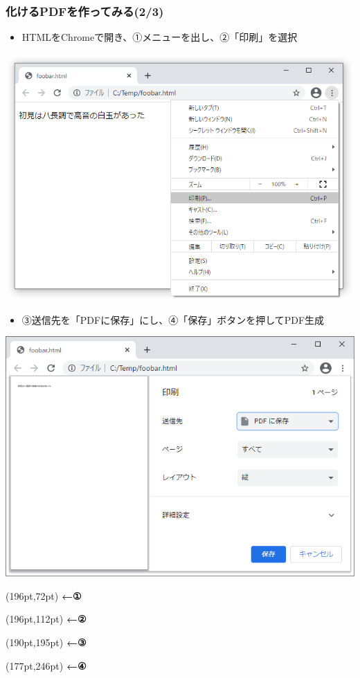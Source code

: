 \begin{frame}\frametitle{化けるPDFを作ってみる(2/3)}
  \begin{itemize}
    \tiny
  \item HTMLをChromeで開き、①メニューを出し、②「印刷」を選択
  \end{itemize}
  \centering
  \includegraphics[width=0.4\linewidth]{chrome-menu-print.png}
  \begin{itemize}
    \tiny
  \item ③送信先を「PDFに保存」にし、④「保存」ボタンを押してPDF生成
  \end{itemize}
  \centering
  \includegraphics[width=0.4\linewidth]{chrome-print-to-pdf.png}

  \begin{textblock*}{0.3\linewidth}(196pt,72pt)
    \tiny \textbf{\color{red} ←①}
  \end{textblock*}
  \begin{textblock*}{0.3\linewidth}(196pt,112pt)
    \tiny \textbf{\color{red} ←②}
  \end{textblock*}
  \begin{textblock*}{0.3\linewidth}(190pt,195pt)
    \tiny \textbf{\color{red} ←③}
  \end{textblock*}
  \begin{textblock*}{0.3\linewidth}(177pt,246pt)
    \tiny \textbf{\color{red} ←④}
  \end{textblock*}
\end{frame}

